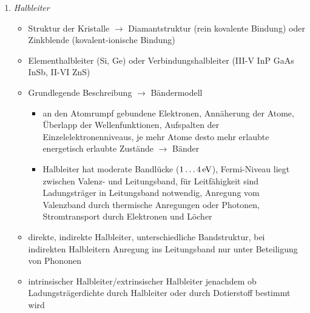 \documentclass[11pt,a4paper]{article}
\begin{document}
\pagestyle{empty}

\begin{enumerate}
	
	\item \emph{Halbleiter}
	
	\begin{itemize}
		
		\item 	Struktur der Kristalle $\rightarrow$ Diamantstruktur (rein kovalente Bindung) oder Zinkblende (kovalent-ionische Bindung)
		
		\item Elementhalbleiter (Si, Ge) oder Verbindungshalbleiter (III-V InP GaAs InSb, II-VI ZnS)
		
		\item Grundlegende Beschreibung $\rightarrow$ Bändermodell
		\begin{itemize}
			
			\item an den Atomrumpf gebundene Elektronen, Annäherung der Atome, Überlapp der Wellenfunktionen, Aufspalten der Einzelelektronenniveaus, je mehr Atome desto mehr erlaubte energetisch erlaubte Zustände $\rightarrow$ Bänder
			
			\item Halbleiter hat moderate Bandlücke ($\unit[1 \dots 4]{eV}$), Fermi-Niveau liegt zwischen Valenz- und Leitungsband, für Leitfähigkeit sind Ladungsträger in Leitungsband notwendig, Anregung vom Valenzband durch thermische Anregungen oder Photonen, Stromtransport durch Elektronen und Löcher
			
		\end{itemize} 
			
			\item direkte, indirekte Halbleiter, unterschiedliche Bandstruktur, bei indirekten Halbleitern Anregung ins Leitungsband nur unter Beteiligung von Phononen
		
			\item intrinsischer Halbleiter/extrinsischer Halbleiter jenachdem ob Ladungsträgerdichte durch Halbleiter oder durch Dotierstoff bestimmt wird
			

\end{itemize}
\end{enumerate}
\end{document}
